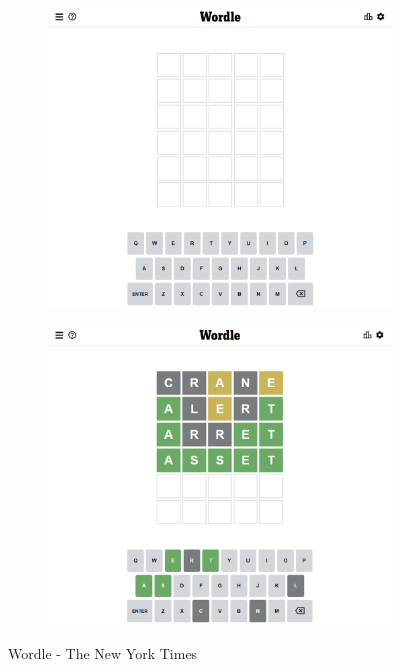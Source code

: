 \begin{figure}[h!]
\centering
\begin{subfigure}{.5\textwidth}
  \centering
  \includegraphics[width=.8\linewidth]{figures/wordle.jpeg}
\end{subfigure}%
\begin{subfigure}{.5\textwidth}
  \centering
  \includegraphics[width=.8\linewidth]{figures/wordle_asset.jpeg}
\end{subfigure}
\caption{Wordle - The New York Times}
\label{fig:test}
\end{figure}

